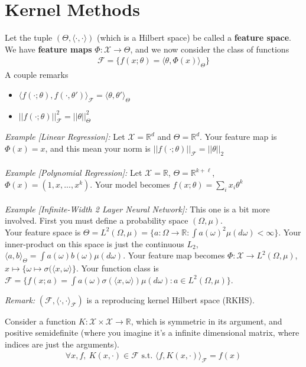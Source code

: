 \section{Kernel Methods}
Let the tuple $(\Theta, \langle \cdot, \cdot \rangle)$ (which is a Hilbert space) be called a \textbf{feature space}. We have \textbf{feature maps} $\Phi: \mathcal X \to \Theta$, and we now consider the class of functions
\begin{align}
	\mathcal F = \{f(x; \theta) = \langle \theta, \Phi(x)\rangle_{\Theta} \}
\end{align}
A couple remarks
\begin{itemize}
	\item $\langle f(\cdot; \theta) , f(\cdot, \theta')\rangle_{\mathcal F} = \langle \theta, \theta' \rangle_{\Theta}$
	\item $|| f(\cdot ; \theta )||^2_{\mathcal F} = ||\theta||_{\Theta}^2 $
\end{itemize}
\begin{sidework}
	\emph{Example [Linear Regression]:} Let $\mathcal X = \mathbb R^d$ and $\Theta = \mathbb R^d$. Your feature map is $\Phi(x) = x$, and this mean your norm is $||f(\cdot; \theta)||_{\mathcal F} = ||\theta||_2$\\
	\\
	\emph{Example [Polynomial Regression]:} Let $\mathcal X = \mathbb R$, $\Theta = \mathbb R^{k + \ell}$, $\Phi(x) = (1, x, ..., x^k)$. Your model becomes $f(x; \theta) = \sum_i x_i \theta^k$\\
	\\
	\emph{Example [Infinite-Width 2 Layer Neural Network]:} This one is a bit more involved. First you must define a probability space $(\Omega, \mu)$. \\
	
	Your feature space is $\Theta = L^2(\Omega, \mu) = \{a: \Omega \to \mathbb R : \int a(\omega)^2 \mu (d\omega) < \infty\}$. Your inner-product on this space is just the continuous $L_2$, $\langle a, b\rangle_{\Theta}  = \int a(\omega) b(\omega) \mu(d\omega)$. Your feature map becomes $\Phi : \mathcal X \to L^2(\Omega, \mu)$, $x \mapsto \{\omega \mapsto \sigma(\langle x, \omega\rangle\}$. Your function class is $\mathcal F = \{f(x; a) = \int a(\omega) \sigma(\langle x, \omega\rangle ) \mu(d\omega) : a \in L^2(\Omega, \mu)\}$. 
\end{sidework}
\emph{Remark:} $(\mathcal F, \langle \cdot, \cdot \rangle_{\mathcal F})$ is a reproducing kernel Hilbert space (RKHS).
\begin{definition}
	 Consider a function $K : \mathcal X \times \mathcal X \to \mathbb R$, which is symmetric in its argument, and positive semidefinite (where you imagine it's a infinite dimensional matrix, where indices are just the arguments).
	\begin{align}
		\forall x,f, ~ K(x, \cdot) \in \mathcal F \text{ s.t. } \langle f, K(x, \cdot) \rangle_{\mathcal F} = f(x)
	\end{align}
\end{definition}
